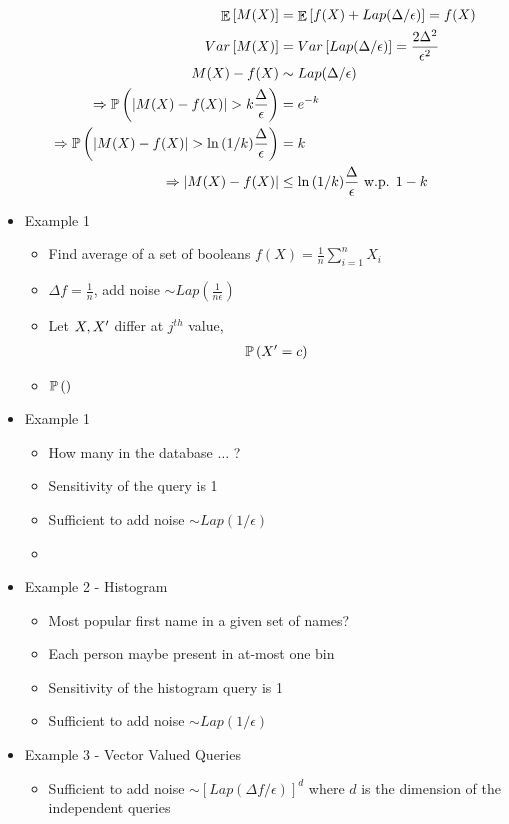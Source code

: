\documentclass{article}
\begin{document}
\begin{itemize}
        \begin{align*}
            \mathop{\mathbb{E}}\left[ M(X) \right] &= \mathop{\mathbb{E}}\left[ f(X) + Lap(\Delta/\epsilon) \right] = f(X)\\
            \mathop{Var}\left[ M(X) \right] &= \mathop{Var}\left[ Lap(\Delta/ \epsilon) \right] = \frac{2 \Delta^2}{\epsilon^2}\\
            M(X)-f(X) &\sim Lap(\Delta/\epsilon)\\
            \Rightarrow \mathbb{P}\left( |M(X)-f(X)| > k\frac{\Delta}{\epsilon} \right) &= e^{-k}\\
            \Rightarrow \mathbb{P}\left( |M(X)-f(X)| > \ln{(1/k)}\frac{\Delta}{\epsilon} \right) &= k\\
            \Rightarrow |M(X)-f(X)| &\leq \ln{(1/k)}\frac{\Delta}{\epsilon} \text{ w.p. } 1-k\\
        \end{align*}
    \item Example 1
        \begin{itemize}
            \item Find average of a set of booleans $f(X) = \frac{1}{n} \sum_{i=1}^n X_i$
            \item $\Delta f = \frac{1}{n}$, add noise $\sim Lap(\frac{1}{n\epsilon})$
            \item Let $X, X^\prime$ differ at $j^{th}$ value,
                \begin{align*}
                    \mathbb{P}\left( X^\prime = c \right)
                \end{align*}
            \item $\mathbb{P}\left(  \right)$
        \end{itemize}
    \item Example 1
        \begin{itemize}
            \item How many in the database $\dots$ ?
            \item Sensitivity of the query is 1
            \item Sufficient to add noise $\sim Lap(1/\epsilon)$
            \item {}
        \end{itemize}
    \item Example 2 - Histogram
        \begin{itemize}
            \item Most popular first name in a given set of names?
            \item Each person maybe present in at-most one bin
            \item Sensitivity of the histogram query is 1
            \item Sufficient to add noise $\sim Lap(1/\epsilon)$
        \end{itemize}
    \item Example 3 - Vector Valued Queries
        \begin{itemize}
            \item Sufficient to add noise $\sim [Lap(\Delta f/\epsilon)]^d$ where $d$ is the dimension of the independent queries
        \end{itemize}
\end{itemize}
\end{document}
